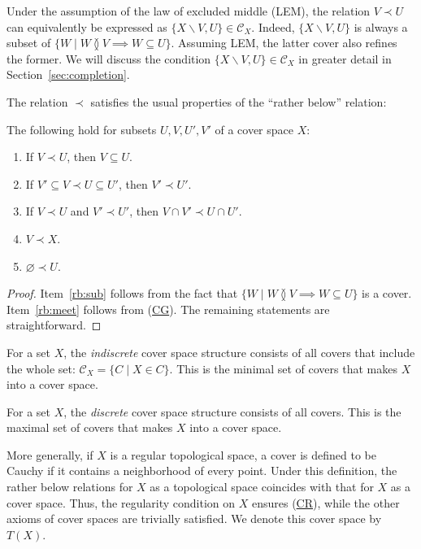 \documentclass[pdflatex,sn-mathphys-num]{sn-jnl}
\newcommand{\axref}[1]{(\hyperref[ax:#1]{#1})}
\theoremstyle{definition}
\theoremstyle{remark}
\numberwithin{figure}{section}
\newcommand{\overlap}[2]{#1 \between #2}
\newcommand{\rb}{\prec}
\begin{document}
\begin{remark}
Under the assumption of the law of excluded middle (LEM), the relation $V \rb U$ can equivalently be expressed as $\{ X \backslash V, U \} \in \mathcal{C}_X$.
Indeed, $\{ X \backslash V, U \}$ is always a subset of $\{ W \mid \overlap{W}{V} \implies W \subseteq U \}$.
Assuming LEM, the latter cover also refines the former.
We will discuss the condition $\{ X \backslash V, U \} \in \mathcal{C}_X$ in greater detail in Section~\ref{sec:completion}.
\end{remark}

The relation $\rb$ satisfies the usual properties of the ``rather below'' relation:

\begin{prop}[rb-props]
The following hold for subsets $U,V,U',V'$ of a cover space $X$:
\begin{enumerate}
\item \label{rb:sub} If $V \rb U$, then $V \subseteq U$.
\item If $V' \subseteq V \rb U \subseteq U'$, then $V' \rb U'$.
\item \label{rb:meet} If $V \rb U$ and $V' \rb U'$, then $V \cap V' \rb U \cap U'$.
\item $V \rb X$.
\item $\varnothing \rb U$.
\end{enumerate}
\end{prop}
\begin{proof}
Item~\eqref{rb:sub} follows from the fact that $\{ W \mid \overlap{W}{V} \implies W \subseteq U \}$ is a cover.
Item~\eqref{rb:meet} follows from \axref{CG}.
The remaining statements are straightforward.
\end{proof}

\begin{example}
For a set $X$, the \emph{indiscrete} cover space structure consists of all covers that include the whole set: $\mathcal{C}_X = \{ C \mid X \in C \}$.
This is the minimal set of covers that makes $X$ into a cover space.
\end{example}

\begin{example}
For a set $X$, the \emph{discrete} cover space structure consists of all covers.
This is the maximal set of covers that makes $X$ into a cover space.
\end{example}

\begin{example}
More generally, if $X$ is a regular topological space, a cover is defined to be Cauchy if it contains a neighborhood of every point.
Under this definition, the rather below relations for $X$ as a topological space coincides with that for $X$ as a cover space.
Thus, the regularity condition on $X$ ensures \axref{CR}, while the other axioms of cover spaces are trivially satisfied.
We denote this cover space by $T(X)$.
\end{example}
\end{document}
